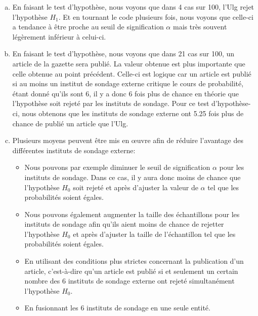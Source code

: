 \documentclass[11pt]{report}
\begin{document}
\begin{enumerate}[(a)]

\item En faisant le test d'hypothèse, nous voyons que dans 4 cas sur 100, l'Ulg rejet l'hypothèse $H_1$. Et en tournant le code plusieurs fois, nous voyons que celle-ci a tendance à être proche au seuil de signification $\alpha$ mais très souvent légèrement inférieur à celui-ci.

\item En faisant le test d'hypothèse, nous voyons que dans 21 cas sur 100, un article de la gazette sera publié. La valeur obtenue est plus importante que celle obtenue au point précédent. Celle-ci est logique car un article est publié si au moins un institut de sondage externe critique le cours de probabilité, étant donné qu'ils sont 6, il y a donc 6 fois plus de chance en théorie que l'hypothèse soit rejeté par les instituts de sondage. Pour ce test d'hypothèse-ci, nous obtenons que les instituts de sondage externe ont 5.25 fois plus de chance de publié un article que l'Ulg. 

\item Plusieurs moyens peuvent être mis en œuvre afin de réduire l'avantage des différentes instituts de sondage externe:

\begin{itemize}

\item Nous pouvons par exemple diminuer le seuil de signification $\alpha$ pour les instituts de sondage. Dans ce cas, il y aura donc moins de chance que l'hypothèse $H_0$ soit rejeté et après d'ajuster la valeur de $\alpha$ tel que les probabilités soient égales.

\item Nous pouvons également augmenter la taille des échantillons pour les instituts de sondage afin qu'ils aient moins de chance de rejetter l'hypothèse $H_0$ et après d'ajuster la taille de l'échantillon tel que les probabilités soient égales.

\item En utilisant des conditions plus strictes concernant la publication d'un article, c'est-à-dire qu'un article est publié si et seulement un certain nombre des 6 instituts de sondage externe ont rejeté simultanément l'hypothèse $H_0$.

\item En fusionnant les 6 instituts de sondage en une seule entité.

\end{itemize}

\end{enumerate}
\end{document}
